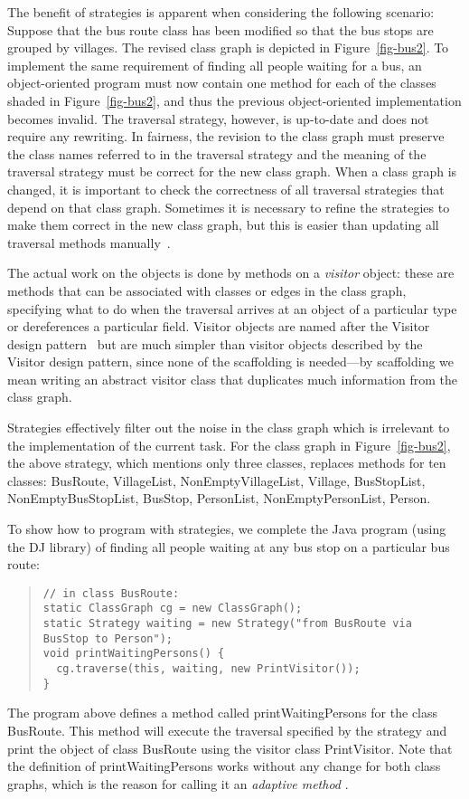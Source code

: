 The benefit of strategies is apparent when considering the following
scenario: Suppose that the bus route class has been modified so that
the bus stops are grouped by villages.  The revised class graph is
depicted in Figure~\ref{fig-bus2}. To implement the same requirement of
finding all people waiting for a bus, an object-oriented program must
now contain one method for each of the classes shaded in
Figure~\ref{fig-bus2}, and thus the previous object-oriented
implementation becomes invalid. The traversal strategy,
however, is up-to-date and does not require any rewriting. In
fairness, the revision to the class graph must preserve the class
names referred to in the traversal strategy and the meaning of the
traversal strategy must be correct for the new class graph.  When a
class graph is changed, it is important to check the correctness of
all traversal strategies that depend on that class graph.  Sometimes
it is necessary to refine the strategies to make them correct in the
new class graph, but this is easier than updating all traversal
methods manually~\cite{karl:demeter}.

The actual work on the objects is done by methods on a \emph{visitor}
object: these are methods that can be associated with classes or edges
in the class graph, specifying what to do when the traversal arrives
at an object of a particular type or dereferences a particular field.
Visitor objects are named after the Visitor design
pattern~\cite{gang-of-4} but are much simpler than visitor objects
described by the Visitor design pattern, since none of the scaffolding
is needed---by scaffolding we mean writing an abstract visitor class
that duplicates much information from the class graph.

Strategies effectively filter out the noise in the class graph which
is irrelevant to the implementation of the current task.  For the
class graph in Figure~\ref{fig-bus2}, the above strategy, which
mentions only three classes, replaces methods for ten classes: {\sf
BusRoute, VillageList, NonEmptyVillageList, Village, BusStopList,
NonEmptyBusStopList, BusStop, PersonList, NonEmptyPersonList, Person}.

To show how to program with strategies, we complete the Java program
(using the DJ library) of finding all people waiting at any bus stop
on a particular bus route:
\begin{quote}
\begin{verbatim}
// in class BusRoute:
static ClassGraph cg = new ClassGraph();
static Strategy waiting = new Strategy("from BusRoute via BusStop to Person");
void printWaitingPersons() {
  cg.traverse(this, waiting, new PrintVisitor());
}
\end{verbatim} 
\end{quote}
The program above defines a method called {\sf printWaitingPersons}
for the class {\sf BusRoute}. This method will execute the traversal
specified by the strategy and print the object of class {\sf BusRoute}
using the visitor class {\sf PrintVisitor}.  Note that the definition
of {\sf printWaitingPersons} works without any change for both class
graphs, which is the reason for calling it an {\em adaptive method}
\cite{adaptive-methods-cacm-2001}.

